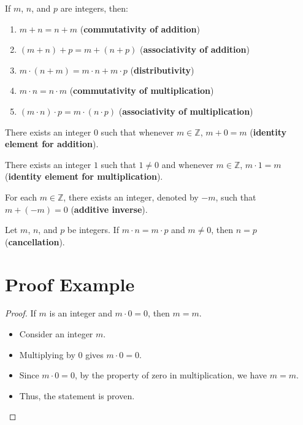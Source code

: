 If $m$, $n$, and $p$ are integers, then:
\begin{enumerate}[label=(\roman*)]
    \item $m+n = n+m$ \hfill (\textbf{commutativity of addition})
    \item $(m+n)+ p = m+(n+ p)$ \hfill (\textbf{associativity of addition})
    \item $m\cdot (n+m) = m\cdot n+m\cdot p$ \hfill (\textbf{distributivity})
    \item $m\cdot n = n\cdot m$ \hfill (\textbf{commutativity of multiplication})
    \item $(m\cdot n) \cdot p = m\cdot (n\cdot p)$ \hfill (\textbf{associativity of multiplication})
\end{enumerate}

There exists an integer $0$ such that whenever $m \in \mathbb{Z}$, $m+0 = m$ (\textbf{identity element for addition}).

There exists an integer $1$ such that $1 \neq 0$ and whenever $m \in \mathbb{Z}$, $m\cdot 1 = m$ (\textbf{identity element for multiplication}).

For each $m \in \mathbb{Z}$, there exists an integer, denoted by $-m$, such that $m+(-m) = 0$ (\textbf{additive inverse}).

Let $m$, $n$, and $p$ be integers. If $m\cdot n = m\cdot p$ and $m \neq 0$, then $n = p$ (\textbf{cancellation}).

\section*{Proof Example}
\begin{proof}
  If \(m\) is an integer and \(m \cdot 0 = 0\), then \(m = m\).
  \begin{itemize}
    \item Consider an integer \(m\).
    \item Multiplying by \(0\) gives \(m \cdot 0 = 0\).
    \item Since \(m \cdot 0 = 0\), by the property of zero in multiplication, we have \(m = m\).
    \item Thus, the statement is proven.\qedhere
  \end{itemize}
\end{proof}
